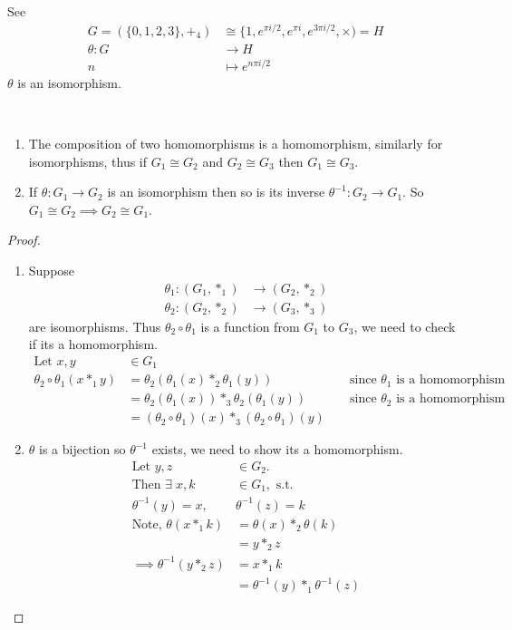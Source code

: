 See 
\begin{align*}
    G = (\{ 0, 1, 2, 3 \}, +_4) &\cong \{1, e^{\pi i/2}, e^{\pi i}, e^{3\pi i/2}, \times) = H \\
    \theta: G &\to H \\
    n &\mapsto e^{n \pi i /2}
\end{align*}
$\theta$ is an isomorphism.

\begin{lemma}~
  \vspace*{-1.5\baselineskip}
\begin{enumerate}
\def\labelenumi{\roman{enumi}.}
  \item The composition of two homomorphisms is a homomorphism, similarly for isomorphisms, thus if $G_1 \cong G_2$ and $G_2 \cong G_3$ then $G_1 \cong G_3$.
  \item
    If $\theta : G_1 \to G_2$ is an isomorphism then so is its inverse $\theta^{-1} : G_2 \to G_1$.
    So $G_1 \cong G_2 \implies G_2 \cong G_1$.
\end{enumerate}
\end{lemma}

\begin{proof} \mbox{} 

\begin{enumerate}
\def\labelenumi{\roman{enumi}.}
  \item Suppose
  \begin{align*}
      \theta_1 : (G_1, *_1) &\to (G_2, *_2) \\
      \theta_2 : (G_2, *_2) &\to (G_3, *_3)
  \end{align*}
  are isomorphisms.
  Thus $\theta_2 \circ \theta_1$ is a function from $G_1$ to $G_3$, we need to check if its a homomorphism.
  \begin{align*}
      \text{Let } x, y &\in G_1 && \\
      \theta_2 \circ \theta_1 (x *_1 y) &= \theta_2(\theta_1(x) *_2 \theta_1(y)) & &\text{ since $\theta_1$ is a homomorphism} \\
      &= \theta_2(\theta_1(x)) *_3 \theta_2(\theta_1(y)) & &\text{ since $\theta_2$ is a homomorphism} \\
      &= (\theta_2 \circ \theta_1)(x) *_3 (\theta_2 \circ \theta_1)(y) &&
  \end{align*}
  \item
    $\theta$ is a bijection so $\theta^{-1}$ exists, we need to show its a homomorphism.
    \begin{align*}
    \text{Let } y, z &\in G_2. \\
    \text{Then } \exists \; x, k &\in G_1, \text{ s.t.} \\
    \theta^{-1}(y) = x,\ &\theta^{-1}(z) = k \\
    \text{Note, } \theta(x *_1 k) &= \theta(x) *_2 \theta(k) \\
    &= y *_2 z \\
    \implies \theta^{-1}(y *_2 z) &= x *_1 k \\
    &= \theta^{-1}(y) *_1 \theta^{-1}(z)
    \end{align*}
\end{enumerate}
\end{proof}


